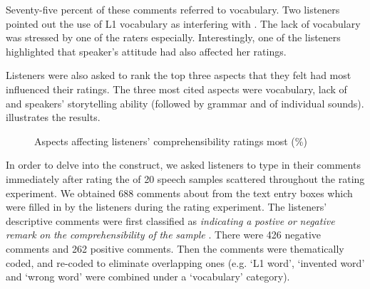 \documentclass[output=paper]{langsci/langscibook}
\begin{document}
\largerpage
Seventy-five percent of these comments referred to vocabulary. Two listeners pointed out the use of {L1} vocabulary as interfering with . The lack of vocabulary was stressed by one of the raters especially. Interestingly, one of the listeners highlighted that speaker’s attitude had also affected her  ratings. 

Listeners were also asked to rank the top three aspects that they felt had most influenced their  ratings. The three most cited aspects were vocabulary, lack of  and speakers’ storytelling ability (followed by grammar and  of individual sounds).  illustrates the results.

\begin{figure}
\caption{\label{fig:delrio:4} Aspects affecting listeners’ comprehensibility ratings most (\%)}


 
    
    
\end{figure}
 

In order to delve into the  construct, we asked listeners to type in their comments immediately after rating the  of 20 speech samples scattered throughout the rating experiment.  We obtained 688 comments about  from the text entry boxes which were filled in by the listeners during the rating experiment. The listeners’ descriptive comments were first classified as \textit{indicating} \textit{a} \textit{postive} \textit{or} \textit{negative} \textit{remark} \textit{on} \textit{the} \textit{comprehensibility} \textit{of} \textit{the} \textit{sample} .  There were 426 negative comments and 262 positive comments. Then the comments were thematically coded, and re-coded to eliminate overlapping ones (e.g. ‘L1 word’, ‘invented word’ and ‘wrong word’ were combined under a ‘vocabulary’ category). 
\end{document}
